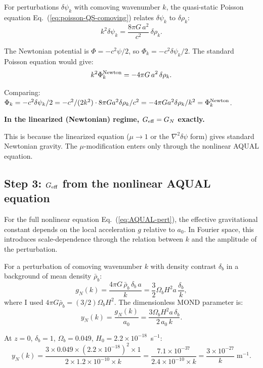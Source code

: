 \documentclass[11pt]{article}
\newcommand{\ee}[1]{\times 10^{#1}}
\newcommand{\dpsi}{\delta\psi}
\newcommand{\Geff}{G_{\rm eff}}
\begin{document}
For perturbations $\dpsi_k$ with comoving wavenumber $k$, the
quasi-static Poisson equation Eq.~(\ref{eq:poisson-QS-comoving})
relates $\dpsi_k$ to $\delta\rho_k$:
\begin{equation}
k^2\dpsi_k = \frac{8\pi G\,a^2}{c^2}\,\delta\rho_k.
\label{eq:fourier-poisson}
\end{equation}

The Newtonian potential is $\Phi = -c^2\psi/2$, so $\Phi_k = -c^2\dpsi_k/2$.
The standard Poisson equation would give:
\begin{equation}
k^2\Phi_k^{\rm Newton} = -4\pi G\,a^2\,\delta\rho_k.
\end{equation}

Comparing: $\Phi_k = -c^2\dpsi_k/2 = -c^2/(2k^2) \cdot 8\pi G a^2\delta\rho_k/c^2
= -4\pi G a^2 \delta\rho_k / k^2 = \Phi_k^{\rm Newton}$.

\textbf{In the linearized (Newtonian) regime, $\Geff = G_N$ exactly.}

This is because the linearized equation ($\mu \to 1$ or the
$\nabla^2\dpsi$ form) gives standard Newtonian gravity. The
$\mu$-modification enters only through the nonlinear AQUAL equation.

\subsection{Step 3: $\Geff$ from the nonlinear AQUAL equation}

For the full nonlinear equation Eq.~(\ref{eq:AQUAL-pert}), the effective
gravitational constant depends on the local acceleration $g$ relative
to $a_0$. In Fourier space, this introduces scale-dependence through
the relation between $k$ and the amplitude of the perturbation.

For a perturbation of comoving wavenumber $k$ with density contrast
$\delta_b$ in a background of mean density $\bar\rho_b$:
\begin{equation}
g_N(k) = \frac{4\pi G\,\bar\rho_b\,\delta_b\,a}{k}
= \frac{3}{2}\Omega_b H^2 a\,\frac{\delta_b}{k},
\end{equation}
where I used $4\pi G\bar\rho_b = (3/2)\Omega_b H^2$. The dimensionless
MOND parameter is:
\begin{equation}
y_N(k) = \frac{g_N(k)}{a_0}
= \frac{3\Omega_b H^2 a\,\delta_b}{2\,a_0\,k}.
\end{equation}

At $z = 0$, $\delta_b = 1$, $\Omega_b = 0.049$, $H_0 = 2.2\ee{-18}$~s$^{-1}$:
\begin{equation}
y_N(k) = \frac{3\times 0.049 \times (2.2\ee{-18})^2 \times 1}{2\times 1.2\ee{-10}\times k}
= \frac{7.1\ee{-37}}{2.4\ee{-10}\times k}
= \frac{3\ee{-27}}{k}\;\text{m}^{-1}.
\end{equation}
\end{document}
